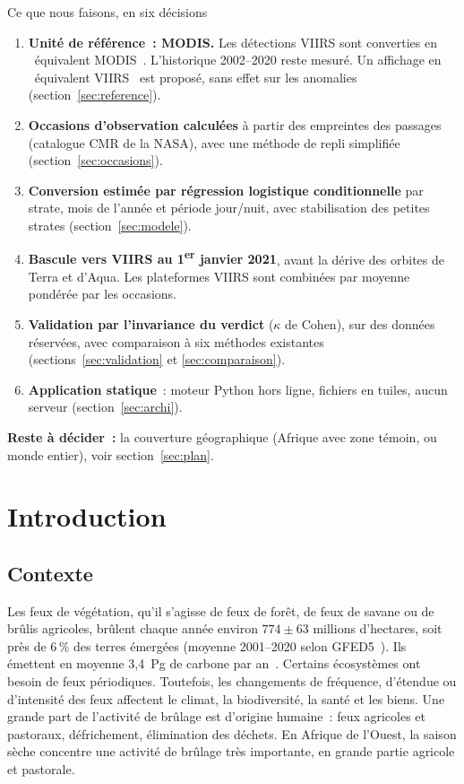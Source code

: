 \documentclass[11pt,a4paper]{article}
\newcommand{\og}{\guillemotleft~}
\newcommand{\fg}{~\guillemotright}
\begin{document}
\begin{decision}{Ce que nous faisons, en six décisions}
\small
\begin{enumerate}[leftmargin=*,itemsep=1pt]
  \item \textbf{Unité de référence~: MODIS.} Les détections VIIRS sont converties en \og équivalent MODIS\fg. L'historique 2002--2020 reste mesuré. Un affichage en \og équivalent VIIRS\fg{} est proposé, sans effet sur les anomalies (section~\ref{sec:reference}).
  \item \textbf{Occasions d'observation calculées} à partir des empreintes des passages (catalogue CMR de la NASA), avec une méthode de repli simplifiée (section~\ref{sec:occasions}).
  \item \textbf{Conversion estimée par régression logistique conditionnelle} par strate, mois de l'année et période jour/nuit, avec stabilisation des petites strates (section~\ref{sec:modele}).
  \item \textbf{Bascule vers VIIRS au 1\textsuperscript{er} janvier 2021}, avant la dérive des orbites de Terra et d'Aqua. Les plateformes VIIRS sont combinées par moyenne pondérée par les occasions.
  \item \textbf{Validation par l'invariance du verdict} ($\kappa$ de Cohen), sur des données réservées, avec comparaison à six méthodes existantes (sections~\ref{sec:validation} et \ref{sec:comparaison}).
  \item \textbf{Application statique}~: moteur Python hors ligne, fichiers en tuiles, aucun serveur (section~\ref{sec:archi}).
\end{enumerate}
\textbf{Reste à décider~:} la couverture géographique (Afrique avec zone témoin, ou monde entier), voir section~\ref{sec:plan}.
\end{decision}

\tableofcontents
\newpage

\section{Introduction}

\subsection{Contexte}

Les feux de végétation, qu'il s'agisse de feux de forêt, de feux de savane ou de brûlis agricoles, brûlent chaque année environ $774 \pm 63$ millions d'hectares, soit près de 6\,\% des terres émergées (moyenne 2001--2020 selon GFED5~\cite{chen2023}). Ils émettent en moyenne 3,4~Pg de carbone par an~\cite{vanderwerf2025}. Certains écosystèmes ont besoin de feux périodiques. Toutefois, les changements de fréquence, d'étendue ou d'intensité des feux affectent le climat, la biodiversité, la santé et les biens. Une grande part de l'activité de brûlage est d'origine humaine~: feux agricoles et pastoraux, défrichement, élimination des déchets. En Afrique de l'Ouest, la saison sèche concentre une activité de brûlage très importante, en grande partie agricole et pastorale.
\end{document}

